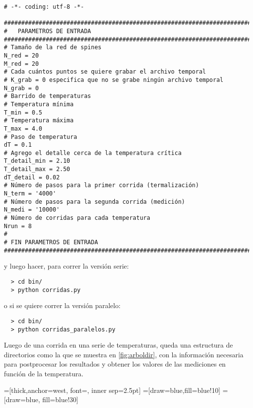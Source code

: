 \begin{verbatim}
# -*- coding: utf-8 -*-

###############################################################################       
#   PARAMETROS DE ENTRADA
###############################################################################
# Tamaño de la red de spines
N_red = 20
M_red = 20
# Cada cuántos puntos se quiere grabar el archivo temporal
# K_grab = 0 especifica que no se grabe ningún archivo temporal
N_grab = 0     
# Barrido de temperaturas
# Temperatura mínima
T_min = 0.5
# Temperatura máxima
T_max = 4.0
# Paso de temperatura
dT = 0.1
# Agrego el detalle cerca de la temperatura crítica
T_detail_min = 2.10
T_detail_max = 2.50
dT_detail = 0.02
# Número de pasos para la primer corrida (termalización)
N_term = '4000'
# Número de pasos para la segunda corrida (medición)
N_medi = '10000'
# Número de corridas para cada temperatura
Nrun = 8
#
# FIN PARAMETROS DE ENTRADA
###############################################################################

\end{verbatim}


y luego hacer, para correr la versión serie:

\begin{verbatim}
  > cd bin/
  > python corridas.py
\end{verbatim}

o si se quiere correr la versión paralelo:

\begin{verbatim}
  > cd bin/
  > python corridas_paralelos.py
\end{verbatim}

Luego de una corrida en una serie de temperaturas, queda una estructura de directorios
como la que se muestra en \ref{fig:arboldir}, con la información necesaria 
para postprocesar
los resultados y obtener los valores de las mediciones en función de la temperatura.


=[thick,anchor=west, 
font={\scriptsize\ttfamily}, inner sep=2.5pt]
=[draw=blue,fill=blue!10]
=[draw=blue, fill=blue!30]

